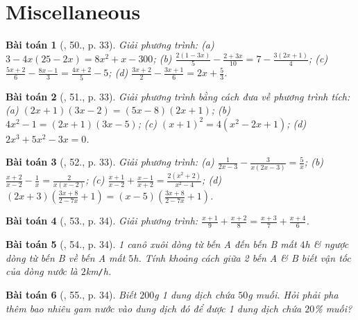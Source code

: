 \documentclass{article}
\newtheorem{baitoan}{Bài toán}
\begin{document}

\section{Miscellaneous}

\begin{baitoan}[\cite{SGK_Toan_8_tap_2}, 50., p. 33]
	Giải phương trình: (a) $3 - 4x(25 - 2x) = 8x^2 + x - 300$; (b) $\frac{2(1 - 3x)}{5} - \frac{2 + 3x}{10} = 7 - \frac{3(2x + 1)}{4}$; (c) $\frac{5x + 2}{6} - \frac{8x - 1}{3} = \frac{4x + 2}{5} - 5$; (d) $\frac{3x + 2}{2} - \frac{3x + 1}{6} = 2x + \frac{5}{3}$.
\end{baitoan}

\begin{baitoan}[\cite{SGK_Toan_8_tap_2}, 51., p. 33]
	Giải phương trình bằng cách đưa về phương trình tích: (a) $(2x + 1)(3x - 2) = (5x - 8)(2x + 1)$; (b) $4x^2 - 1 = (2x + 1)(3x - 5)$; (c) $(x + 1)^2 = 4(x^2 - 2x + 1)$; (d) $2x^3 + 5x^2 - 3x = 0$.
\end{baitoan}

\begin{baitoan}[\cite{SGK_Toan_8_tap_2}, 52., p. 33]
	Giải phương trình: (a) $\frac{1}{2x - 3} - \frac{3}{x(2x - 3)} = \frac{5}{x}$; (b) $\frac{x + 2}{x - 2} - \frac{1}{x} = \frac{2}{x(x - 2)}$; (c) $\frac{x + 1}{x - 2} + \frac{x - 1}{x + 2} = \frac{2(x^2 + 2)}{x^2 - 4}$; (d) $(2x + 3)\left(\frac{3x + 8}{2 - 7x} + 1\right) = (x - 5)\left(\frac{3x + 8}{2 - 7x} + 1\right)$.
\end{baitoan}

\begin{baitoan}[\cite{SGK_Toan_8_tap_2}, 53., p. 34]
	Giải phương trình: $\frac{x + 1}{9} + \frac{x + 2}{8} = \frac{x + 3}{7} + \frac{x + 4}{6}$.
\end{baitoan}

\begin{baitoan}[\cite{SGK_Toan_8_tap_2}, 54., p. 34]
	1 canô xuôi dòng từ bến A đến bến B mất $4$\emph{h} \& ngược dòng từ bến B về bến A mất $5$\emph{h}. Tính khoảng cách giữa 2 bến A \& B biết vận tốc của dòng nước là $2$\emph{km\texttt{/}h}. 
\end{baitoan}

\begin{baitoan}[\cite{SGK_Toan_8_tap_2}, 55., p. 34]
	Biết $200$\emph{g} 1 dung dịch chứa $50$\emph{g} muối. Hỏi phải pha thêm bao nhiêu gam nước vào dung dịch đó để được 1 dung dịch chứa $20$\% muối?
\end{baitoan}
\end{document}
